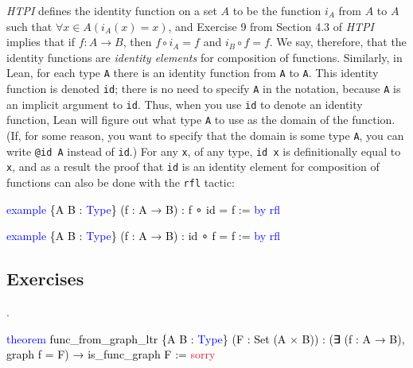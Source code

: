 \documentclass[
  letterpaper,
  DIV=11,
  numbers=noendperiod]{scrreprt}
\newenvironment{Shaded}{\begin{snugshade}}{\end{snugshade}}
\newcommand{\ConstantTok}[1]{\textcolor[rgb]{0.56,0.35,0.01}{#1}}
\newcommand{\KeywordTok}[1]{\textcolor[rgb]{0.00,0.23,0.31}{#1}}
\newcommand{\NormalTok}[1]{\textcolor[rgb]{0.00,0.23,0.31}{#1}}
\renewcommand{\NormalTok}[1]{\textcolor[HTML]{000000}{#1}}
\renewcommand{\KeywordTok}[1]{\textcolor[HTML]{0000FF}{#1}}
\renewcommand{\ConstantTok}[1]{\textcolor[HTML]{DC143C}{#1}}
\newcommand{\nobreakShaded}{\renewenvironment{Shaded}
	{\begin{tcolorbox}[frame hidden, enhanced, interior hidden, boxrule=0pt,
		borderline west={3pt}{0pt}{shadecolor}, sharp corners]}
	{\end{tcolorbox}}}
\newenvironment{numex}[1]
	{\begin{minipage}[t]{0.04\textwidth}\vspace{8pt}{#1}.
		\end{minipage}\nobreakShaded\begin{minipage}[t]{0.96\textwidth}\vspace{0pt}}
	{\end{minipage}}
\theoremstyle{remark}
\begin{document}
\emph{HTPI} defines the identity function on a set \(A\) to be the
function \(i_A\) from \(A\) to \(A\) such that
\(\forall x \in A(i_A(x) = x)\), and Exercise 9 from Section 4.3 of
\emph{HTPI} implies that if \(f : A \to B\), then \(f \circ i_A = f\)
and \(i_B \circ f = f\). We say, therefore, that the identity functions
are \emph{identity elements} for composition of functions. Similarly, in
Lean, for each type \texttt{A} there is an identity function from
\texttt{A} to \texttt{A}. This identity function is denoted \texttt{id};
there is no need to specify \texttt{A} in the notation, because
\texttt{A} is an implicit argument to \texttt{id}. Thus, when you use
\texttt{id} to denote an identity function, Lean will figure out what
type \texttt{A} to use as the domain of the function. (If, for some
reason, you want to specify that the domain is some type \texttt{A}, you
can write \texttt{@id\ A} instead of \texttt{id}.) For any \texttt{x},
of any type, \texttt{id\ x} is definitionally equal to \texttt{x}, and
as a result the proof that \texttt{id} is an identity element for
composition of functions can also be done with the \texttt{rfl} tactic:

\begin{Shaded}
\begin{Highlighting}[]
\KeywordTok{example}\NormalTok{ \{A B : }\KeywordTok{Type}\NormalTok{\} (f : A → B) : f ∘ id = f := }\KeywordTok{by} \KeywordTok{rfl}

\KeywordTok{example}\NormalTok{ \{A B : }\KeywordTok{Type}\NormalTok{\} (f : A → B) : id ∘ f = f := }\KeywordTok{by} \KeywordTok{rfl}
\end{Highlighting}
\end{Shaded}

\hypertarget{exercises-10}{%
\subsection{Exercises}\label{exercises-10}}

\begin{numex}{1}

\begin{Shaded}
\begin{Highlighting}[]
\KeywordTok{theorem}\NormalTok{ func\_from\_graph\_ltr \{A B : }\KeywordTok{Type}\NormalTok{\} (F : Set (A × B)) :}
\NormalTok{    (∃ (f : A → B), graph f = F) → is\_func\_graph F := }\ConstantTok{sorry}
\end{Highlighting}
\end{Shaded}

\end{numex}
\end{document}
